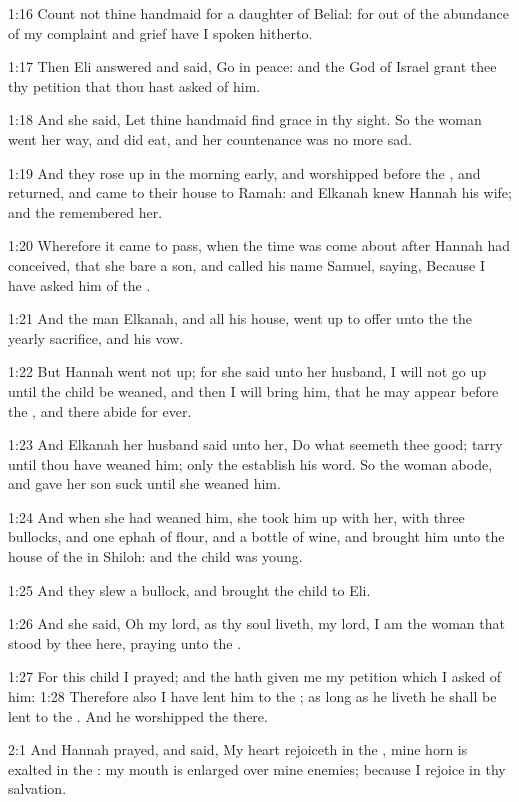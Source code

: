 1:16 Count not thine handmaid for a daughter of Belial: for out of the
abundance of my complaint and grief have I spoken hitherto.

1:17 Then Eli answered and said, Go in peace: and the God of Israel
grant thee thy petition that thou hast asked of him.

1:18 And she said, Let thine handmaid find grace in thy sight. So the
woman went her way, and did eat, and her countenance was no more sad.

1:19 And they rose up in the morning early, and worshipped before the
\LORD, and returned, and came to their house to Ramah: and Elkanah knew
Hannah his wife; and the \LORD remembered her.

1:20 Wherefore it came to pass, when the time was come about after
Hannah had conceived, that she bare a son, and called his name Samuel,
saying, Because I have asked him of the \LORD.

1:21 And the man Elkanah, and all his house, went up to offer unto the
\LORD the yearly sacrifice, and his vow.

1:22 But Hannah went not up; for she said unto her husband, I will not
go up until the child be weaned, and then I will bring him, that he
may appear before the \LORD, and there abide for ever.

1:23 And Elkanah her husband said unto her, Do what seemeth thee good;
tarry until thou have weaned him; only the \LORD establish his word. So
the woman abode, and gave her son suck until she weaned him.

1:24 And when she had weaned him, she took him up with her, with three
bullocks, and one ephah of flour, and a bottle of wine, and brought
him unto the house of the \LORD in Shiloh: and the child was young.

1:25 And they slew a bullock, and brought the child to Eli.

1:26 And she said, Oh my lord, as thy soul liveth, my lord, I am the
woman that stood by thee here, praying unto the \LORD.

1:27 For this child I prayed; and the \LORD hath given me my petition
which I asked of him: 1:28 Therefore also I have lent him to the \LORD;
as long as he liveth he shall be lent to the \LORD. And he worshipped
the \LORD there.

2:1 And Hannah prayed, and said, My heart rejoiceth in the \LORD, mine
horn is exalted in the \LORD: my mouth is enlarged over mine enemies;
because I rejoice in thy salvation.

